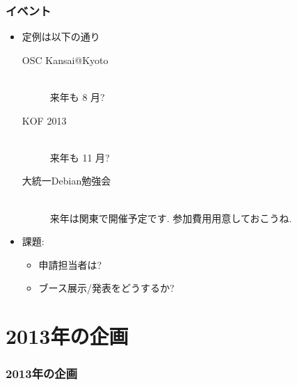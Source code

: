 \documentclass[cjk,dvipdfmx,10pt,compress,%
hyperref={bookmarks=true,bookmarksnumbered=true,bookmarksopen=false,%
colorlinks=false,%
pdftitle={第 67 回 関西 Debian 勉強会},%
pdfauthor={倉敷・のがた・佐々木・かわだ},%
pdfsubject={資料},%
}]{beamer}
\begin{document}


\begin{frame}
  \frametitle{イベント}
  \begin{itemize}
  \item 定例は以下の通り
    \begin{description}
    \item[OSC Kansai@Kyoto] \mbox{~}\\
      来年も 8 月?
    \item[KOF 2013] \mbox{~}\\
      来年も 11 月?
    \item[大統一Debian勉強会] \mbox{~}\\
      来年は関東で開催予定です. 参加費用用意しておこうね.
    \end{description}
  \item 課題:
    \begin{itemize}
    \item 申請担当者は?
    \item ブース展示/発表をどうするか?
    \end{itemize}
  \end{itemize}
\end{frame}

\section{ 2013年の企画 }

\begin{frame}
  \frametitle{2013年の企画}
\end{frame}



\takahashi[50]{  }
\end{document}
